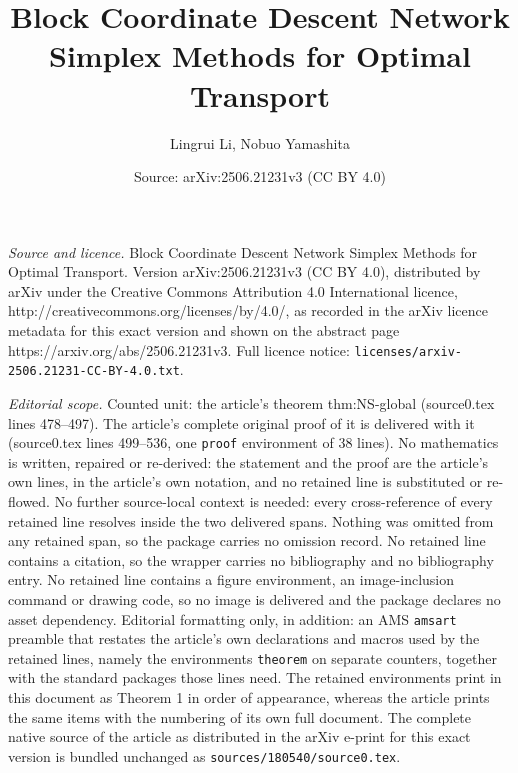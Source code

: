 \documentclass[10pt,a4paper]{amsart}
\title{Block Coordinate Descent Network Simplex Methods for Optimal Transport}
\author{Lingrui Li, Nobuo Yamashita}
\date{Source: arXiv:2506.21231v3 (CC BY 4.0)}
\begin{document}
\maketitle

\noindent\emph{Source and licence.} Block Coordinate Descent Network Simplex Methods for Optimal Transport. Version arXiv:2506.21231v3 (CC BY 4.0), distributed by arXiv under the Creative Commons Attribution 4.0 International licence, http://creativecommons.org/licenses/by/4.0/, as recorded in the arXiv licence metadata for this exact version and shown on the abstract page https://arxiv.org/abs/2506.21231v3. Full licence notice: \texttt{licenses/arxiv-2506.21231-CC-BY-4.0.txt}.\par\smallskip

\noindent\textit{Editorial scope.} Counted unit: the article's theorem thm:NS-global (source0.tex lines 478--497). The article's complete original proof of it is delivered with it (source0.tex lines 499--536, one \texttt{proof} environment of 38 lines). No mathematics is written, repaired or re-derived: the statement and the proof are the article's own lines, in the article's own notation, and no retained line is substituted or re-flowed.  No further source-local context is needed: every cross-reference of every retained line resolves inside the two delivered spans.  Nothing was omitted from any retained span, so the package carries no omission record.  No retained line contains a citation, so the wrapper carries no bibliography and no bibliography entry.  No retained line contains a figure environment, an image-inclusion command or drawing code, so no image is delivered and the package declares no asset dependency.  Editorial formatting only, in addition: an AMS \texttt{amsart} preamble that restates the article's own declarations and macros used by the retained lines, namely the environments \texttt{theorem} on separate counters, together with the standard packages those lines need.  The retained environments print in this document as Theorem 1 in order of appearance, whereas the article prints the same items with the numbering of its own full document.  The complete native source of the article as distributed in the arXiv e-print for this exact version is bundled unchanged as \texttt{sources/180540/source0.tex}.
\end{document}
